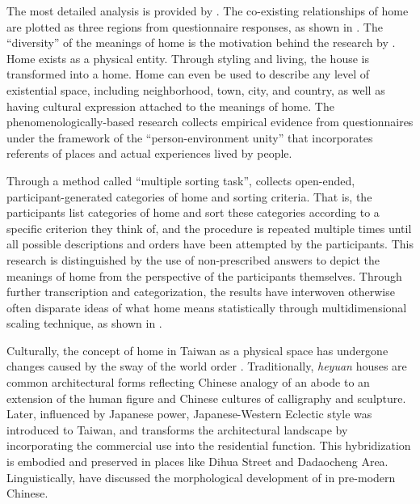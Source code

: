 The most detailed analysis is provided by \textcite{sixsmith1986meaning}. The co-existing relationships of home are plotted as three regions from questionnaire responses, as shown in . The ``diversity'' of the meanings of home is the motivation behind the research by \textcite{sixsmith1986meaning}. Home exists as a physical entity. Through styling and living, the house is transformed into a home. Home can even be used to describe any level of existential space, including neighborhood, town, city, and country, as well as having cultural expression attached to the meanings of home. The phenomenologically-based research collects empirical evidence from questionnaires under the framework of the ``person-environment unity'' that incorporates referents of places and actual experiences lived by people.

Through a method called ``multiple sorting task'', \textcite{sixsmith1986meaning} collects open-ended, participant-generated categories of home and sorting criteria. That is, the participants list categories of home and sort these categories according to a specific criterion they think of, and the procedure is repeated multiple times until all possible descriptions and orders have been attempted by the participants. This research is distinguished by the use of non-prescribed answers to depict the meanings of home from the perspective of the participants themselves. Through further transcription and categorization, the results have interwoven otherwise often disparate ideas of what home means statistically through multidimensional scaling technique, as shown in .

Culturally, the concept of home in Taiwan as a physical space has undergone changes caused by the sway of the world order \parencite{沈孟穎2015台灣現代住宅設計之轉化}. Traditionally, \textit{heyuan} houses are common architectural forms reflecting Chinese analogy of an abode to an extension of the human figure and Chinese cultures of calligraphy and sculpture. Later, influenced by Japanese power, Japanese-Western Eclectic style was introduced to Taiwan, and  transforms the architectural landscape by incorporating the commercial use into the residential function. This hybridization is embodied and preserved in places like Dihua Street and Dadaocheng Area. Linguistically, \textcite{wang2005jia} have discussed the morphological development of \jia in pre-modern Chinese.

